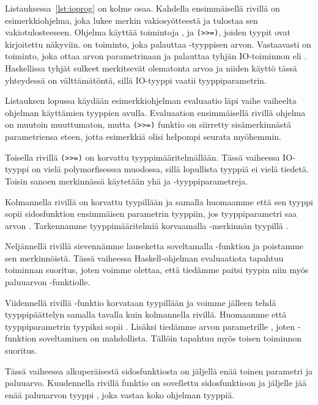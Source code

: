 \documentclass[finnish]{tktltiki2}
\begin{document}
Listauksessa~\ref{lst:ioprog} on kolme osaa. Kahdella ensimmäisellä rivillä on esimerkkiohjelma,
joka lukee merkin vakiosyötteestä ja tulostaa sen vakiotulosteeseen. Ohjelma käyttää toimintoja
,  ja \verb|(>>=)|, joiden tyypit ovat kirjoitettu näkyviin.
 on toiminto, joka palauttaa -tyyppisen arvon. Vastaavasti 
on toiminto, joka ottaa  arvon parametrinaan ja palauttaa tyhjän IO-toiminnon eli
. Haskellissa tyhjät sulkeet merkitsevät olematonta arvoa ja niiden käyttö tässä
yhteydessä on välttämätöntä, sillä IO-tyyppi vaatii tyyppiparametrin.

Listauksen lopussa käydään esimerkkiohjelman evaluaatio läpi vaihe vaiheelta ohjelman käyttämien
tyyppien avulla. Evaluaation ensimmäisellä rivillä ohjelma on muutoin muuttumaton, mutta
\verb|(>>=)| funktio on siirretty sisämerkinnästä parametriensa eteen, jotta esimerkkiä olisi
helpompi seurata myöhemmin.

Toisella rivillä \verb|(>>=)| on korvattu tyyppimääritelmällään. Tässä vaiheessa IO-tyyppi on vielä
polymorfisesssa muodossa, sillä lopullista tyyppiä ei vielä tiedetä. Toisin sanoen merkinnässä
käytetään yhä  ja  -tyyppiparametreja.

Kolmannella rivillä  on korvattu tyypillään ja samalla huomaamme että sen tyyppi sopii
sidosfunktion ensimmäisen parametrin tyyppiin, jos tyyppiparametri  saa arvon .
Tarkennamme tyyppimääritelmiä korvaamalla  -merkinnän tyypillä .

Neljännellä rivillä sievennämme lauseketta soveltamalla -funktion ja poistamme sen
merkinnöistä. Tässä vaiheessa Haskell-ohjelman evaluaatiota tapahtuu toiminnan suoritus, joten
voimme olettaa, että tiedämme paitsi tyypin niin myös paluuarvon -funktiolle.

Viidennellä rivillä -funktio korvataan tyypillään ja voimme jälleen tehdä
tyyppipäättelyn samalla tavalla kuin kolmannella rivillä. Huomaamme että tyyppiparametrin 
tyypiksi sopii \code{()}. Lisäksi tiedämme arvon parametrille , joten
-funktion soveltaminen on mahdollista. Tällöin tapahtuu myös toisen toiminnon
suoritus.

Tässä vaiheessa alkuperäisestä sidosfunktiosta on jäljellä enää toinen parametri ja paluuarvo.
Kuudennella rivillä funktio  on sovellettu sidosfunktioon ja jäljelle jää enää
paluuarvon tyyppi , joka vastaa koko ohjelman tyyppiä.
\end{document}
